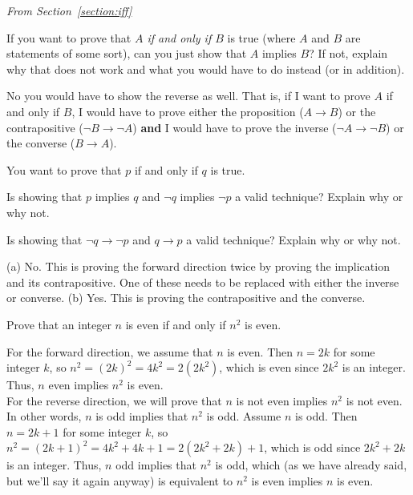 {{\medskip 

\noindent
{\em From Section~\ref{section:iff}

\begin{requ}
If you want to prove that {\em $A$ if and only if $B$} is true (where $A$ and $B$ are statements of some sort), 
can you just show that $A$ implies $B$?
If not, explain why that does not work and what you would have to do instead (or in addition).
\begin{requanswer}
No you would have to show the reverse as well. 
That is, if I want to prove $A$ if and only if $B$,
I would have to prove either the proposition ($A\rightarrow B$) or the contrapositive ($\neg B \rightarrow \neg A$) 
{\bf and} I would have to prove the inverse ($\neg A\rightarrow \neg B$) or the converse ($B\rightarrow A$). 
\end{requanswer}
\end{requ}

\begin{requ}
You want to prove that $p$ if and only if $q$ is true.
\begin{lenum}
\item
Is showing that $p$ implies $q$ and $\neg q$ implies $\neg p$
a valid technique?
Explain why or why not.
\item
Is showing that $\neg q\rightarrow\neg p$ and $q\rightarrow p$ 
a valid technique?
Explain why or why not.
\end{lenum}
\begin{requanswer}
(a) No. This is proving the forward direction twice by proving the implication and its contrapositive. 
One of these needs to be replaced with either the inverse or converse.
(b) Yes. This is proving the contrapositive and the converse.
\end{requanswer}
\end{requ}

\begin{requ}
Prove that an integer $n$ is even if and only if  $n^2$ is even.
\begin{requanswer}
For the forward direction, we assume that $n$ is even.
Then $n=2k$ for some integer $k$, 
so $n^2=(2k)^2=4k^2=2(2k^2)$, which is even since
$2k^2$ is an integer. Thus, $n$ even implies $n^2$ is even.\\
For the reverse direction, we will prove that
$n$ is not even implies $n^2$ is not even. In other words,
$n$ is odd implies that $n^2$ is odd.
Assume $n$ is odd. Then $n=2k+1$ for some integer $k$,
so $n^2=(2k+1)^2=4k^2+4k+1=2(2k^2+2k)+1$, which is odd since $2k^2+2k$ is an integer.
Thus, $n$ odd implies that $n^2$ is odd, which (as we have already
said, but we'll say it again anyway) is equivalent to  
$n^2$ is even implies $n$ is even.
\end{requanswer}
\end{requ}

}}}
